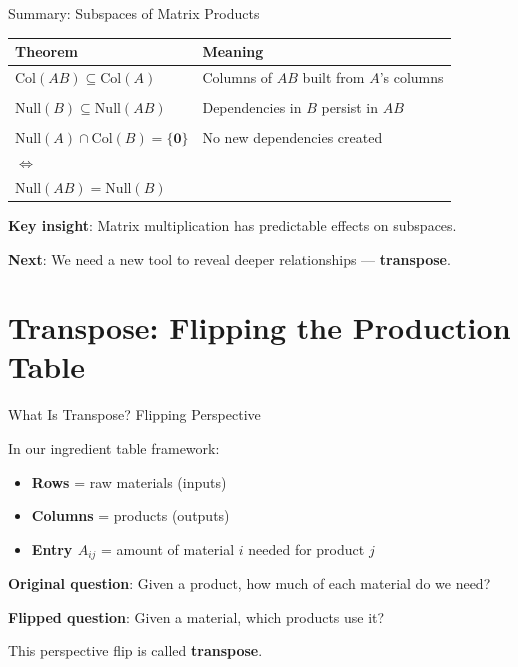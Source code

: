 \documentclass[10pt]{beamer}
\theoremstyle{definition}
\newcommand{\x}[1]{\alert{\textbf{#1}}}
\begin{document}
\begin{frame}{Summary: Subspaces of Matrix Products}

\begin{center}
\begin{tabular}{|l|l|}
\hline
\textbf{Theorem} & \textbf{Meaning} \\
\hline
$\text{Col}(AB) \subseteq \text{Col}(A)$ & Columns of $AB$ built from $A$'s columns \\
& \\
$\text{Null}(B) \subseteq \text{Null}(AB)$ & Dependencies in $B$ persist in $AB$ \\
& \\
$\text{Null}(A) \cap \text{Col}(B) = \{\mathbf{0}\}$ & No new dependencies created \\
$\Leftrightarrow$ & \\
$\text{Null}(AB) = \text{Null}(B)$ & \\
\hline
\end{tabular}
\end{center}

\vspace{1em}

\x{Key insight}: Matrix multiplication has predictable effects on subspaces.

\vspace{0.5em}

\x{Next}: We need a new tool to reveal deeper relationships — \x{transpose}.

\end{frame}

\section{Transpose: Flipping the Production Table}

\begin{frame}{What Is Transpose? Flipping Perspective}

In our ingredient table framework:

\vspace{1em}

\begin{itemize}
\item \x{Rows} = raw materials (inputs)
\item \x{Columns} = products (outputs)
\item \x{Entry $A_{ij}$} = amount of material $i$ needed for product $j$
\end{itemize}

\vspace{1em}

\x{Original question}: Given a product, how much of each material do we need?

\vspace{1em}

\x{Flipped question}: Given a material, which products use it?

\vspace{1em}

This perspective flip is called \x{transpose}.

\end{frame}
\end{document}
